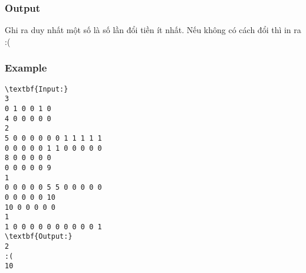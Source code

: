 \subsubsection{Output}

Ghi ra duy nhất một số là số lần đổi tiền ít nhất. Nếu không có cách đổi thì in ra :(

\subsubsection{Example}
\begin{verbatim}
\textbf{Input:}
3
0 1 0 0 1 0 
4 0 0 0 0 0
2
5 0 0 0 0 0 0 1 1 1 1 1
0 0 0 0 0 1 1 0 0 0 0 0
8 0 0 0 0 0
0 0 0 0 0 9
1
0 0 0 0 0 5 5 0 0 0 0 0
0 0 0 0 0 10
10 0 0 0 0 0
1
1 0 0 0 0 0 0 0 0 0 0 1
\textbf{Output:}
2
:(
10\end{verbatim}
